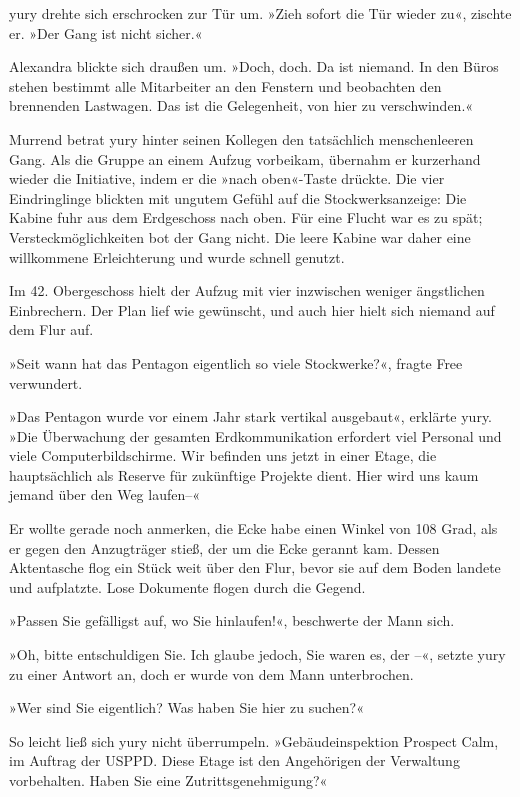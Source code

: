 yury drehte sich erschrocken zur Tür um. »Zieh sofort die Tür wieder zu«, zischte er. »Der Gang ist nicht sicher.«

Alexandra blickte sich draußen um. »Doch, doch. Da ist niemand. In den Büros stehen bestimmt alle Mitarbeiter an den Fenstern und beobachten den brennenden Lastwagen. Das ist die Gelegenheit, von hier zu verschwinden.«

Murrend betrat yury hinter seinen Kollegen den tatsächlich menschenleeren Gang. Als die Gruppe an einem Aufzug vorbeikam, übernahm er kurzerhand wieder die Initiative, indem er die »nach oben«-Taste drückte. Die vier Eindringlinge blickten mit ungutem Gefühl auf die Stockwerksanzeige: Die Kabine fuhr aus dem Erdgeschoss nach oben. Für eine Flucht war es zu spät; Versteckmöglichkeiten bot der Gang nicht. Die leere Kabine war daher eine willkommene Erleichterung und wurde schnell genutzt.

Im 42. Obergeschoss hielt der Aufzug mit vier inzwischen weniger ängstlichen Einbrechern. Der Plan lief wie gewünscht, und auch hier hielt sich niemand auf dem Flur auf.

»Seit wann hat das Pentagon eigentlich so viele Stockwerke?«, fragte Free verwundert.

»Das Pentagon wurde vor einem Jahr stark vertikal ausgebaut«, erklärte yury. »Die Überwachung der gesamten Erdkommunikation erfordert viel Personal und viele Computerbildschirme. Wir befinden uns jetzt in einer Etage, die hauptsächlich als Reserve für zukünftige Projekte dient. Hier wird uns kaum jemand über den Weg laufen–«

Er wollte gerade noch anmerken, die Ecke habe einen Winkel von 108 Grad, als er gegen den Anzugträger stieß, der um die Ecke gerannt kam. Dessen Aktentasche flog ein Stück weit über den Flur, bevor sie auf dem Boden landete und aufplatzte. Lose Dokumente flogen durch die Gegend.

»Passen Sie gefälligst auf, wo Sie hinlaufen!«, beschwerte der Mann sich.

»Oh, bitte entschuldigen Sie. Ich glaube jedoch, Sie waren es, der –«, setzte yury zu einer Antwort an, doch er wurde von dem Mann unterbrochen.

»Wer sind Sie eigentlich? Was haben Sie hier zu suchen?«

So leicht ließ sich yury nicht überrumpeln. »Gebäudeinspektion Prospect Calm, im Auftrag der USPPD. Diese Etage ist den Angehörigen der Verwaltung vorbehalten. Haben Sie eine Zutrittsgenehmigung?«

